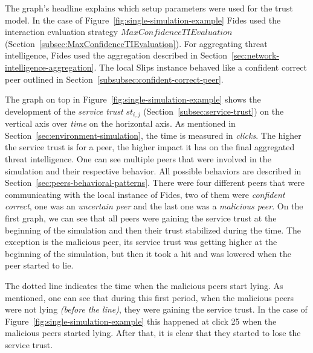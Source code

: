 The graph's headline explains which setup parameters were used for the trust model. In the case of Figure~\ref{fig:single-simulation-example} Fides used the interaction evaluation strategy $MaxConfidenceTIEvaluation$ (Section~\ref{subsec:MaxConfidenceTIEvaluation}).
For aggregating threat intelligence, Fides used the aggregation described in Section~\ref{sec:network-intelligence-aggregation}.
The local Slips instance behaved like a confident correct peer outlined in Section~\ref{subsubsec:confident-correct-peer}.

The graph on top in Figure~\ref{fig:single-simulation-example} shows the development of the \textit{service trust} $st_{i, j}$ (Section~\ref{subsec:service-trust}) on the vertical axis over \textit{time} on the horizontal axis. As mentioned in Section~\ref{sec:environment-simulation}, the time is measured in \textit{clicks}.
The higher the service trust is for a peer, the higher impact it has on the final aggregated threat intelligence.
One can see multiple peers that were involved in the simulation and their respective behavior. All possible behaviors are described in Section~\ref{sec:peers-behavioral-patterns}.
There were four different peers that were communicating with the local instance of Fides, two of them were \textit{confident correct}, one was an \textit{uncertain peer} and the last one was a \textit{malicious peer}.
On the first graph, we can see that all peers were gaining the service trust at the beginning of the simulation and then their trust stabilized during the time. The exception is the malicious peer, its service trust was getting higher at the beginning of the simulation, but then it took a hit and was lowered when the peer started to lie. 

The dotted line indicates the time when the malicious peers start lying.
As mentioned, one can see that during this first period, when the malicious peers were not lying \textit{(before the line)}, they were gaining the service trust.
In the case of Figure~\ref{fig:single-simulation-example} this happened at click 25 when the malicious peers started lying.
After that, it is clear that they started to lose the service trust.


